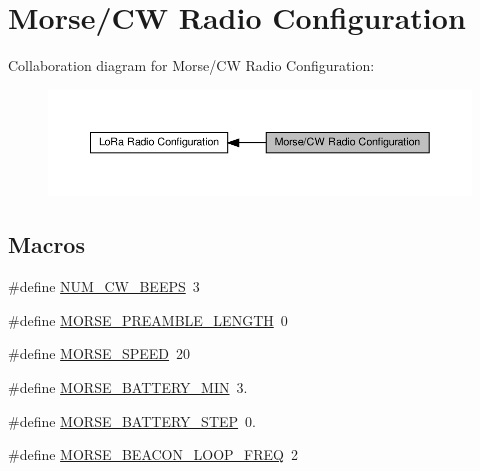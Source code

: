 \hypertarget{group__defines__radio__morse__cw__configuration}{}\section{Morse/\+CW Radio Configuration}
\label{group__defines__radio__morse__cw__configuration}
Collaboration diagram for Morse/\+CW Radio Configuration\+:
\nopagebreak
\begin{figure}[H]
\begin{center}
\leavevmode
\includegraphics[width=350pt]{group__defines__radio__morse__cw__configuration}
\end{center}
\end{figure}
\subsection*{Macros}
\begin{DoxyCompactItemize}
\item 
\#define \hyperlink{group__defines__radio__morse__cw__configuration_gaae7df1e5ab7ea07920fef2cc9456cbdd}{N\+U\+M\+\_\+\+C\+W\+\_\+\+B\+E\+E\+PS}~3
\item 
\#define \hyperlink{group__defines__radio__morse__cw__configuration_ga7713a1dd2dd939f0314fb6abf067deb5}{M\+O\+R\+S\+E\+\_\+\+P\+R\+E\+A\+M\+B\+L\+E\+\_\+\+L\+E\+N\+G\+TH}~0
\item 
\#define \hyperlink{group__defines__radio__morse__cw__configuration_ga7ecb6f014f236823544c51e3d9d43c30}{M\+O\+R\+S\+E\+\_\+\+S\+P\+E\+ED}~20
\item 
\#define \hyperlink{group__defines__radio__morse__cw__configuration_ga4573c7b1d2f3cdaddadb3fe7aae6de6f}{M\+O\+R\+S\+E\+\_\+\+B\+A\+T\+T\+E\+R\+Y\+\_\+\+M\+IN}~3.
\item 
\#define \hyperlink{group__defines__radio__morse__cw__configuration_ga2d1e75f9b5a4f4217800b4cc91f2bcbb}{M\+O\+R\+S\+E\+\_\+\+B\+A\+T\+T\+E\+R\+Y\+\_\+\+S\+T\+EP}~0.
\item 
\#define \hyperlink{group__defines__radio__morse__cw__configuration_gab3651b3dc8b84b12fe86ec9a8a9aaaae}{M\+O\+R\+S\+E\+\_\+\+B\+E\+A\+C\+O\+N\+\_\+\+L\+O\+O\+P\+\_\+\+F\+R\+EQ}~2
\end{DoxyCompactItemize}


